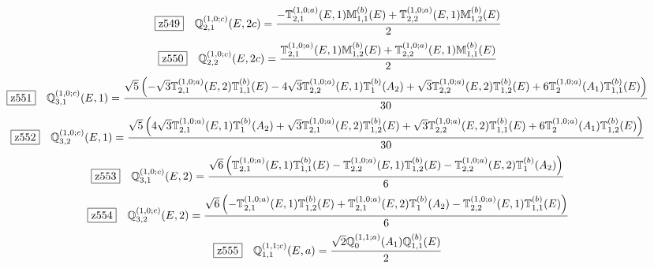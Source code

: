 \documentclass[fleqn,10pt,landscape]{jsarticle}
\begin{document}
\begin{dmath*}
\hspace*{3mm}\fbox{z549}\quad \mathbb{Q}_{2,1}^{(1,0;c)}(E,2c)=\frac{- \mathbb{T}_{2,1}^{(1,0;a)}(E,1) \mathbb{M}_{1,1}^{(b)}(E) + \mathbb{T}_{2,2}^{(1,0;a)}(E,1) \mathbb{M}_{1,2}^{(b)}(E)}{2}
\end{dmath*}
\begin{dmath*}
\hspace*{3mm}\fbox{z550}\quad \mathbb{Q}_{2,2}^{(1,0;c)}(E,2c)=\frac{\mathbb{T}_{2,1}^{(1,0;a)}(E,1) \mathbb{M}_{1,2}^{(b)}(E) + \mathbb{T}_{2,2}^{(1,0;a)}(E,1) \mathbb{M}_{1,1}^{(b)}(E)}{2}
\end{dmath*}
\begin{dmath*}
\hspace*{3mm}\fbox{z551}\quad \mathbb{Q}_{3,1}^{(1,0;c)}(E,1)=\frac{\sqrt{5} \left(- \sqrt{3} \mathbb{T}_{2,1}^{(1,0;a)}(E,2) \mathbb{T}_{1,1}^{(b)}(E) - 4 \sqrt{3} \mathbb{T}_{2,2}^{(1,0;a)}(E,1) \mathbb{T}_{1}^{(b)}(A_{2}) + \sqrt{3} \mathbb{T}_{2,2}^{(1,0;a)}(E,2) \mathbb{T}_{1,2}^{(b)}(E) + 6 \mathbb{T}_{2}^{(1,0;a)}(A_{1}) \mathbb{T}_{1,1}^{(b)}(E)\right)}{30}
\end{dmath*}
\begin{dmath*}
\hspace*{3mm}\fbox{z552}\quad \mathbb{Q}_{3,2}^{(1,0;c)}(E,1)=\frac{\sqrt{5} \left(4 \sqrt{3} \mathbb{T}_{2,1}^{(1,0;a)}(E,1) \mathbb{T}_{1}^{(b)}(A_{2}) + \sqrt{3} \mathbb{T}_{2,1}^{(1,0;a)}(E,2) \mathbb{T}_{1,2}^{(b)}(E) + \sqrt{3} \mathbb{T}_{2,2}^{(1,0;a)}(E,2) \mathbb{T}_{1,1}^{(b)}(E) + 6 \mathbb{T}_{2}^{(1,0;a)}(A_{1}) \mathbb{T}_{1,2}^{(b)}(E)\right)}{30}
\end{dmath*}
\begin{dmath*}
\hspace*{3mm}\fbox{z553}\quad \mathbb{Q}_{3,1}^{(1,0;c)}(E,2)=\frac{\sqrt{6} \left(\mathbb{T}_{2,1}^{(1,0;a)}(E,1) \mathbb{T}_{1,1}^{(b)}(E) - \mathbb{T}_{2,2}^{(1,0;a)}(E,1) \mathbb{T}_{1,2}^{(b)}(E) - \mathbb{T}_{2,2}^{(1,0;a)}(E,2) \mathbb{T}_{1}^{(b)}(A_{2})\right)}{6}
\end{dmath*}
\begin{dmath*}
\hspace*{3mm}\fbox{z554}\quad \mathbb{Q}_{3,2}^{(1,0;c)}(E,2)=\frac{\sqrt{6} \left(- \mathbb{T}_{2,1}^{(1,0;a)}(E,1) \mathbb{T}_{1,2}^{(b)}(E) + \mathbb{T}_{2,1}^{(1,0;a)}(E,2) \mathbb{T}_{1}^{(b)}(A_{2}) - \mathbb{T}_{2,2}^{(1,0;a)}(E,1) \mathbb{T}_{1,1}^{(b)}(E)\right)}{6}
\end{dmath*}
\begin{dmath*}
\hspace*{3mm}\fbox{z555}\quad \mathbb{Q}_{1,1}^{(1,1;c)}(E,a)=\frac{\sqrt{2} \mathbb{Q}_{0}^{(1,1;a)}(A_{1}) \mathbb{Q}_{1,1}^{(b)}(E)}{2}
\end{dmath*}
\end{document}
